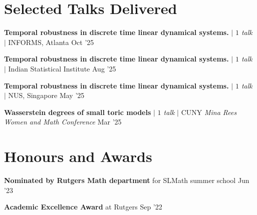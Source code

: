 \section{Selected Talks Delivered}
\resumeSubHeadingListStart

\resumeProjectHeading
{\textbf{Temporal robustness in discrete time linear dynamical systems.} $|$ \emph{$1$ talk} $|$ INFORMS, Atlanta}
{Oct '25}
{}
\vspace{\mygap}

\resumeProjectHeading
{\textbf{Temporal robustness in discrete time linear dynamical systems.} $|$ \emph{$1$ talk} $|$ Indian Statistical Institute}
{Aug '25}
{}
\vspace{\mygap}

\resumeProjectHeading
{\textbf{Temporal robustness in discrete time linear dynamical systems.} $|$ \emph{$1$ talk} $|$ NUS, Singapore}
{May '25}
{}
\vspace{\mygap}

\resumeProjectHeading
{\textbf{Wasserstein degrees of small toric models} $|$ \emph{$1$ talk} $|$ CUNY \textit{Mina Rees Women and Math Conference}}
{Mar '25}
{}
\vspace{\mygap}
\resumeSubHeadingListEnd
\vspace{-5pt}











\section{Honours and Awards}
\resumeSubHeadingListStart

\resumeProjectHeading
{\textbf{Nominated by Rutgers Math department} for SLMath summer school}
{Jun '23}
{\resumeItemListStart
{}
\resumeItemListEnd}
\vspace{-13pt}

\resumeProjectHeading
{\textbf{Academic Excellence Award} at Rutgers}
{Sep '22}
{\resumeItemListStart
{}
\resumeItemListEnd}
\vspace{-13pt}

